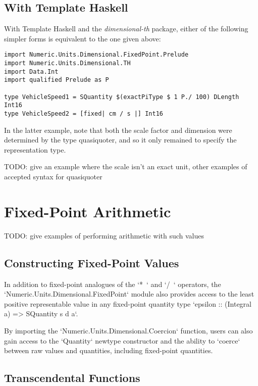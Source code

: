 \documentclass[11pt]{report}
\newcommand{\packagename}[1]{\textit{#1}}
\begin{document}
\subsection{With Template Haskell} \label{fixed-point-th}

With Template Haskell and the \packagename{dimensional-th} package, either of the following simpler forms is equivalent to the one given above:

\begin{lstlisting}
import Numeric.Units.Dimensional.FixedPoint.Prelude
import Numeric.Units.Dimensional.TH
import Data.Int
import qualified Prelude as P

type VehicleSpeed1 = SQuantity $(exactPiType $ 1 P./ 100) DLength Int16
type VehicleSpeed2 = [fixed| cm / s |] Int16
\end{lstlisting}

In the latter example, note that both the scale factor and dimension were determined by the type quasiquoter, and so it
only remained to specify the representation type.

TODO: give an example where the scale isn't an exact unit, other examples of accepted syntax for quasiquoter

\section{Fixed-Point Arithmetic}

TODO: give examples of performing arithmetic with such values

\subsection{Constructing Fixed-Point Values}

In addition to fixed-point analogues of the `*~` and `/~` operators, the `Numeric.Units.Dimensional.FixedPoint`
module also provides access to the least positive representable value in any fixed-point quantity type `epsilon :: (Integral a) => SQuantity s d a`.

By importing the `Numeric.Units.Dimensional.Coercion` function, users can also gain access to the `Quantity` newtype constructor
and the ability to `coerce` between raw values and quantities, including fixed-point quantities.

\subsection{Transcendental Functions}
\end{document}
